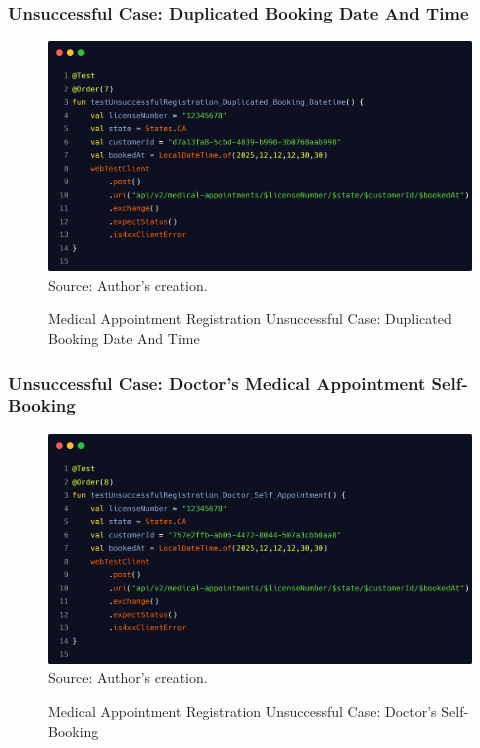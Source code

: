 \subsubsection{Unsuccessful Case: Duplicated Booking Date And Time}

\begin{figure}[H]
	\centering
	\caption{Medical Appointment Registration Unsuccessful Case: Duplicated Booking Date And Time}
	\includegraphics[width=1\linewidth]{figures/medical_appointment_registration_integration_test_unsuccessful_case_duplicared_booking_datetime.png}
	\label{fig:medical_appointment_registration_integration_test_unsuccessful_case_duplicared_booking_datetime}
	\footnotesize Source: Author's creation.
\end{figure}

\subsubsection{Unsuccessful Case: Doctor's Medical Appointment Self-Booking}

\begin{figure}[H]
	\centering
	\caption{Medical Appointment Registration Unsuccessful Case: Doctor's Self-Booking}
	\includegraphics[width=1\linewidth]{figures/medical_appointment_registration_integration_test_unsuccessful_case_doctor_self_booking.png}
	\label{fig:medical_appointment_registration_integration_test_unsuccessful_case_doctor_self_booking}
	\footnotesize Source: Author's creation.
\end{figure}

